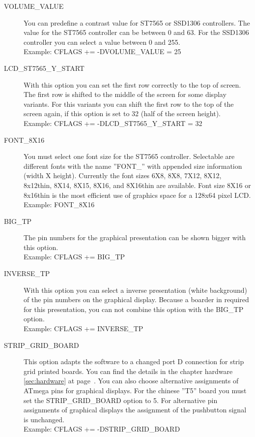 \begin{description}
  \item[VOLUME\_VALUE] You can predefine a contrast value for ST7565 or SSD1306 controllers.
The value for the ST7565 controller can be between 0 and 63. For the SSD1306 controller you can
select a value between 0 and 255.\\
Example: CFLAGS += -DVOLUME\_VALUE = 25

  \item[LCD\_ST7565\_Y\_START] With this option you can set the first row correctly to the top of screen.
The first row is shifted to the middle of the screen for some display variants.
For this variants you can shift the first row to the top of the screen again,
if this option is set to 32 (half of the screen height).\\
Example: CFLAGS += -DLCD\_ST7565\_Y\_START = 32

  \item[FONT\_8X16] You must select one font size for the ST7565 controller.
Selectable are different fonts with the name ''FONT\_'' with appended size information (width X height).
Currently the font sizes 6X8, 8X8, 7X12, 8X12, 8x12thin, 8X14, 8X15, 8X16, and 8X16thin are available.
Font size 8X16 or 8x16thin is the most efficient use of graphics space for a 128x64 pixel LCD.\\
Example: FONT\_8X16

 \item[BIG\_TP] The pin numbers for the graphical presentation can be shown bigger with this option.\\
Example: CFLAGS += BIG\_TP

 \item[INVERSE\_TP] With this option you can select a inverse presentation (white background) of the pin numbers
on the graphical display.
Because a boarder in required for this presentation, you can not combine this option with the BIG\_TP option.\\
Example: CFLAGS += INVERSE\_TP

  \item[STRIP\_GRID\_BOARD] This option adapts the software to a changed port D connection for strip grid printed boards.
You can find the details in the chapter hardware \ref{sec:hardware} at page~\pageref{sec:hardware}.
You can also choose alternative assignments of ATmega pins for graphical displays.
For the chinese ''T5'' board you must set the STRIP\_GRID\_BOARD option to 5.
For alternative pin assignments of graphical displays the assignment of the pushbutton signal is unchanged.\\
Example: CFLAGS += -DSTRIP\_GRID\_BOARD


\end{description}
